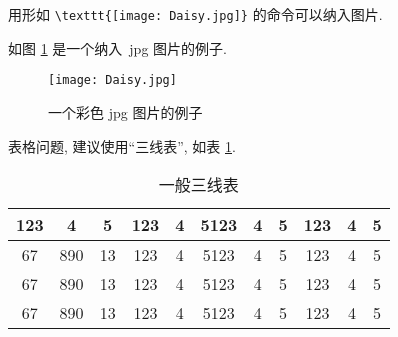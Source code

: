 \documentclass[forlib]{HDUMaster}   %
\begin{document}
用形如 \verb|\texttt{[image: Daisy.jpg]}| 的命令可以纳入图片.

如图 \ref{fig:1} 是一个纳入~jpg 图片的例子.

\begin{figure}[ht]
\centering
  \texttt{[image: Daisy.jpg]}
  \caption{一个彩色 jpg 图片的例子}
  \label{fig:1}
\end{figure}

表格问题, 建议使用``三线表'', 如表 \ref{tab:1}.

\begin{table}[ht]
\centering
\caption{一般三线表}
\label{tab:1}
    \begin{tabular}{c c c c c c c c c c c}
    \hline
    123 & 4  & 5  & 123 & 4 & 5123 & 4 & 5 & 123 & 4 & 5\\
    \hline
    67 & 890 & 13 & 123 & 4 & 5123 & 4 & 5 & 123 & 4 & 5\\
    67 & 890 & 13 & 123 & 4 & 5123 & 4 & 5 & 123 & 4 & 5\\
    67 & 890 & 13 & 123 & 4 & 5123 & 4 & 5 & 123 & 4 & 5\\
    \hline
    \end{tabular}
\end{table}

\end{document}
